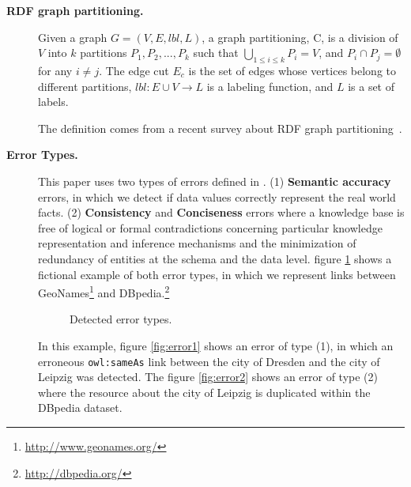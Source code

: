 \begin{description}
\item[\textbf{RDF graph partitioning.}]
Given a graph $G=(V,E, lbl, L)$, a graph partitioning, C, is a division of $V$ into $k$ partitions ${P_1,P_2,...,P_k}$ such that $\bigcup\limits_{1 \leq i \leq k}P_i=V$, and $P_i \cap P_j = \emptyset$ for any $i \neq j$. The edge cut $E_c$ is the set of edges whose vertices belong to different partitions, $lbl : E \cup V \rightarrow L$ is a labeling function, and $L$ is a set of labels. 



The definition comes from a recent survey about RDF graph partitioning~\cite{tomaszuk2015rdf}.

\item[\textbf{Error Types.}]

This paper uses two types of errors defined in \cite{cedal2017}. (1) \textbf{Semantic accuracy} errors, in which we detect if data values correctly represent the real world facts. (2) \textbf{Consistency} and \textbf{Conciseness} errors where a knowledge base is free of logical or formal contradictions concerning particular knowledge representation and inference mechanisms and the minimization of redundancy of entities at the schema and the data level. 
figure \ref{fig:errorType} shows a fictional example of both error types, in which we represent links between  GeoNames\footnote{\url{http://www.geonames.org/}} and DBpedia.\footnote{\url{http://dbpedia.org/}}

\begin{figure}[H]
	\centering
	\caption{Detected error types.}
	\label{fig:errorType}
\end{figure}
%
In this example, figure \ref{fig:error1} shows an error of type (1), in which an erroneous \texttt{owl:sameAs} link between the city of Dresden and the city of Leipzig was detected. The figure \ref{fig:error2} shows an error of type (2) where the resource about the city of Leipzig is duplicated within the DBpedia dataset. 


\end{description}

